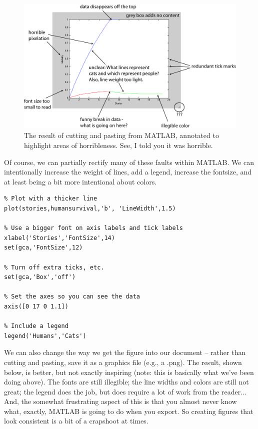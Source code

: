 \begin{figure}[h!]
\includegraphics[width=6.5in]{figs/uglycatfigureannotated}
\caption{The result of cutting and pasting from MATLAB, annotated to highlight areas of horribleness.  See, I told you it was horrible.}
\label{fig:uglycatfigure}
\end{figure}

Of course, we can partially rectify many of these faults within MATLAB. We can intentionally increase the weight of lines, add a legend, increase the fontsize, and at least being a bit more intentional about colors.

\begin{verbatim}
% Plot with a thicker line
plot(stories,humansurvival,'b', 'LineWidth',1.5) 

% Use a bigger font on axis labels and tick labels
xlabel('Stories','FontSize',14) 
set(gca,'FontSize',12)

% Turn off extra ticks, etc.
set(gca,'Box','off') 

% Set the axes so you can see the data
axis([0 17 0 1.1])

% Include a legend
legend('Humans','Cats') 
\end{verbatim}


We can also change the way we get the figure into our document -- rather than cutting and pasting, save it as a graphics file (e.g., a .png).  The result, shown below, is better, but not exactly inspiring (note: this is basically what we've been doing above).  The fonts are still illegible; the line widths and colors are still not great; the legend does the job, but does require a lot of work from the reader... And, the somewhat frustrating aspect of this is that you almost never know what, exactly, MATLAB is going to do when you export.   So creating figures that look consistent is a bit of a crapshoot at times.






